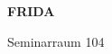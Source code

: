 \documentclass[a4paper]{article}
\begin{document}
\printGenericVSLHeader
\begin{center}
\begin{vsltext}{3cm}{4cm}

   \vspace{0.5cm} 

    \textbf{FRIDA} 

    \vspace{1.5cm}

    Seminarraum 104

\end{vsltext}

\end{center}
\end{document}
